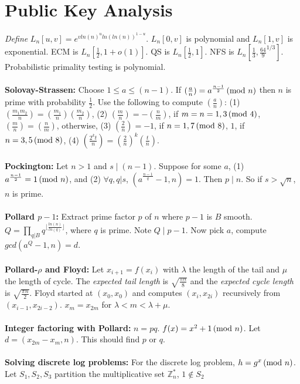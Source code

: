 \section{Public Key Analysis}
\emph{Define} $L_n[u,v]= e^{vln(n)^u ln(ln(n))^{1-u}}$.  $L_n[0,v]$ is polynomial and
$L_n[1,v]$ is exponential.  
ECM is $L_n[{\frac 1 2}, 1+o(1)]$.
QS is $L_n[{\frac 1 2}, 1]$.
NFS is $L_n[{\frac 1 3}, {\frac {64} 9}^{1/3}]$.
Probabilistic primality testing is polynomial.
\\
\\
{\bf Solovay-Strassen:} Choose $1 \leq a \leq (n-1)$.  If
$({\frac a n}) = a^{\frac {n-1} 2} \thinspace \textnormal{(mod } n \textnormal{)}$ then $n$ is prime
with probability ${\frac 1 2}$.  Use the following to compute
$({\frac a n})$:
(1) $({\frac {m_1 m_2} n})= ({\frac {m_1} n}) ({\frac {m_2} n})$,
(2) $({\frac {m} n})= -({\frac n m})$, if $m=n=1, 3
\thinspace \textnormal{(mod } 4 \textnormal{)}$, $({\frac {m} n})= ({\frac n m})$, otherwise,
(3) $({\frac {2} n})= -1$, if $n= 1,7 \thinspace \textnormal{(mod } 8 \textnormal{)}$, $1$, if
$n= 3,5 \thinspace \textnormal{(mod } 8 \textnormal{)}$,
(4) $({\frac {2^k t} n})= ({\frac 2 n})^k ({\frac {t} n})$.
\\
\\
{\bf Pockington:}
Let $n>1$ and $s \mid (n-1)$.  Suppose for some $a$, (1)
$a^{\frac {n-1} 2}=1 \thinspace \textnormal{(mod } n \textnormal{)}$, and (2)
$\forall q, q|s$, $(
a^{\frac {n-1} q}-1, n)= 1$.  Then $p \mid n$.  So if
$s> {\sqrt n}$, $n$ is prime.
\\
\\
{\bf Pollard $p-1$:}  Extract prime factor $p$ of $n$ where $p-1$ is $B$ smooth. 
$Q= \prod_{q|B} q^{ \lfloor \frac {ln(n)} {ln(q)} \rfloor}$, where $q$ is prime. 
Note $Q \mid p-1$.  Now pick $a$, compute $gcd( a^Q - 1 , n) = d$.
\\
\\
{\bf Pollard-$\rho$ and Floyd:}
Let $x_{i+1}= f( x_i )$ with $\lambda$ the length of the tail and $\mu$ the length of cycle.  
The \emph{expected tail length} is $\sqrt {\frac {\pi n} {8}}$ and
the \emph{expected cycle length} is $\sqrt {\frac {\pi n} {2}}$.
Floyd started at $(x_0, x_0)$ and computes $(x_i, x_{2i})$ recursively from
$(x_{i-1}, x_{2i-2})$.  $x_m= x_{2m}$ for $\lambda < m < \lambda + \mu$.
\\
\\
{\bf Integer factoring with Pollard:} 
$n=pq$.  $f(x)= x^2+1 \thinspace \textnormal{(mod } n \textnormal{)}$. Let $d= (x_{2m}-x_m,n)$.  This should
find $p$ or $q$.
\\
\\
{\bf Solving discrete log problems:}
For the discrete log problem, $h= g^x \thinspace \textnormal{(mod } n \textnormal{)}$.
Let $S_1, S_2 , S_3$ partition the multiplicative set ${\mathbb Z}_n^*$, $1 \notin S_2$
